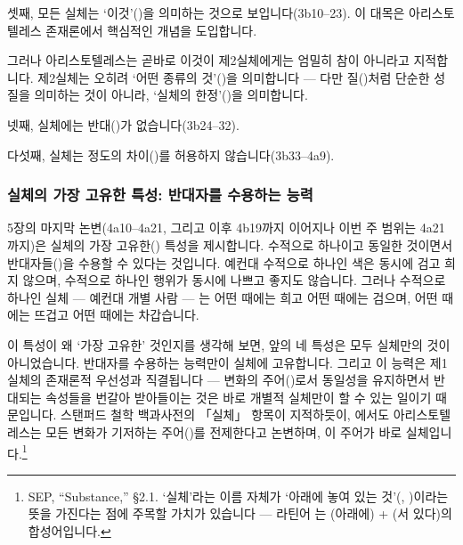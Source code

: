 \documentclass[12pt, a4paper]{article}
\begin{document}
셋째, 모든 실체는 `이것'()을 의미하는 것으로 보입니다(3b10--23). 이 대목은 아리스토텔레스 존재론에서 핵심적인 개념을 도입합니다.


그러나 아리스토텔레스는 곧바로 이것이 제2실체에게는 엄밀히 참이 아니라고 지적합니다. 제2실체는 오히려 `어떤 종류의 것'()을 의미합니다 --- 다만 질()처럼 단순한 성질을 의미하는 것이 아니라, `실체의 한정'()을 의미합니다.

넷째, 실체에는 반대()가 없습니다(3b24--32).

다섯째, 실체는 정도의 차이()를 허용하지 않습니다(3b33--4a9).

\subsubsection{실체의 가장 고유한 특성: 반대자를 수용하는 능력}

5장의 마지막 논변(4a10--4a21, 그리고 이후 4b19까지 이어지나 이번 주 범위는 4a21까지)은 실체의 가장 고유한() 특성을 제시합니다. 수적으로 하나이고 동일한 것이면서 반대자들()을 수용할 수 있다는 것입니다. 예컨대 수적으로 하나인 색은 동시에 검고 희지 않으며, 수적으로 하나인 행위가 동시에 나쁘고 좋지도 않습니다. 그러나 수적으로 하나인 실체 --- 예컨대 개별 사람 --- 는 어떤 때에는 희고 어떤 때에는 검으며, 어떤 때에는 뜨겁고 어떤 때에는 차갑습니다.

이 특성이 왜 `가장 고유한' 것인지를 생각해 보면, 앞의 네 특성은 모두 실체만의 것이 아니었습니다. 반대자를 수용하는 능력만이 실체에 고유합니다. 그리고 이 능력은 제1실체의 존재론적 우선성과 직결됩니다 --- 변화의 주어()로서 동일성을 유지하면서 반대되는 속성들을 번갈아 받아들이는 것은 바로 개별적 실체만이 할 수 있는 일이기 때문입니다. 스탠퍼드 철학 백과사전의 「실체」 항목이 지적하듯이, 에서도 아리스토텔레스는 모든 변화가 기저하는 주어()를 전제한다고 논변하며, 이 주어가 바로 실체입니다.\footnote{SEP, ``Substance,'' §2.1. `실체'라는 이름 자체가 `아래에 놓여 있는 것'(, )이라는 뜻을 가진다는 점에 주목할 가치가 있습니다 --- 라틴어 는 (아래에) + (서 있다)의 합성어입니다.}
\end{document}
